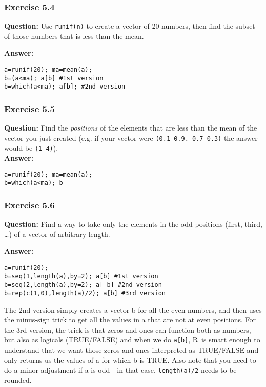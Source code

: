 \documentclass [11pt]{article}
\newcommand{\code}[1]{{\tt #1}}
\newcommand\R{{\sf R}}
\begin{document}
\subsubsection*{Exercise 5.4}
\textbf{Question:}  Use \code{runif(n)} to create a vector of 20 numbers, then find the subset of those numbers that is less than the mean.

\textbf{Answer:}
\begin{verbatim}
a=runif(20); ma=mean(a); 
b=(a<ma); a[b] #1st version
b=which(a<ma); a[b]; #2nd version
\end{verbatim}

\subsubsection*{Exercise 5.5}
\textbf{Question:} Find the \emph{positions} of the elements that are less than the mean of the vector you just created (e.g. if your vector were
\verb+(0.1 0.9. 0.7 0.3)+ the answer would be \verb+(1 4)+).\\
\textbf{Answer:}
\begin{verbatim}
a=runif(20); ma=mean(a); 
b=which(a<ma); b
\end{verbatim}

\subsubsection*{Exercise 5.6}
\textbf{Question:} Find a way to take only the elements in the odd positions (first, third, \ldots) of a vector of arbitrary length.

\textbf{Answer:}
\begin{verbatim}
a=runif(20); 
b=seq(1,length(a),by=2); a[b] #1st version
b=seq(2,length(a),by=2); a[-b] #2nd version
b=rep(c(1,0),length(a)/2); a[b] #3rd version
\end{verbatim}
The 2nd version simply creates a vector b for all the even numbers, and then uses the minus-sign trick to get all the values in a that are not at even positions. For the 3rd version, the trick is that zeros and ones can function both as numbers, but also as logicals (TRUE/FALSE) and when we do \code{a[b]}, \R\ is smart enough to understand that we want those zeros and ones interpreted as TRUE/FALSE and only returns us the values of a for which b is TRUE. Also note that you need to do a minor adjustment if a is odd - in that case, \code{length(a)/2} needs to be rounded.
\end{document}
